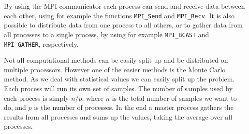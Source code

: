 		By using the MPI communicator each process can send and receive data between each other, using for example the functions {\tt MPI\_Send} and {\tt MPI\_Recv}. It is also possible to distribute data from one process to all others, or to gather data from all processes to a single process, by using for example {\tt MPI\_BCAST} and {\tt MPI\_GATHER}, respectively. 

		Not all computational methods can be easily split up
                and be distributed on multiple processors. However one
                of the easier methods is the Monte Carlo method. As we
                deal with statistical values we can easily split up
                the problem. Each process will run its own set of
                samples. The number of samples used by each process is
                simply $n/p$, where $n$ is the total number of samples
                we want to do, and $p$ is the number of processes. In
                the end a master process gathers the results from all
                processes and sums up the values, taking the average
                over all processes.
